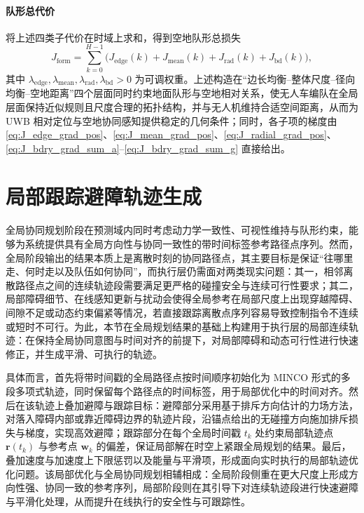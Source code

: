 \paragraph{队形总代价}
将上述四类子代价在时域上求和，得到空地队形总损失
\begin{equation}
\label{eq:J_form_total}
J_{\mathrm{form}}
=\sum_{k=0}^{H-1}\Big(
J_{\mathrm{edge}}(k)
+J_{\mathrm{mean}}(k)
+J_{\mathrm{rad}}(k)
+J_{\mathrm{bd}}(k)
\Big),
\end{equation}
其中 \(\lambda_{\mathrm{edge}},\lambda_{\mathrm{mean}},\lambda_{\mathrm{rad}},\lambda_{\mathrm{bd}}>0\) 为可调权重。上述构造在“边长均衡--整体尺度--径向均衡--空地距离”四个层面同时约束地面队形与空地相对关系，使无人车编队在全局层面保持近似规则且尺度合理的拓扑结构，并与无人机维持合适空间距离，从而为 UWB 相对定位与空地协同感知提供稳定的几何条件；同时，各子项的梯度由\eqref{eq:J_edge_grad_pos}、\eqref{eq:J_mean_grad_pos}、\eqref{eq:J_radial_grad_pos}、\eqref{eq:J_bdry_grad_sum_a}--\eqref{eq:J_bdry_grad_sum_g} 直接给出。

\section{局部跟踪避障轨迹生成} \label{sec:local-tracking}

全局协同规划阶段在预测域内同时考虑动力学一致性、可视性维持与队形约束，能够为系统提供具有全局方向性与协同一致性的带时间标签参考路径点序列。然而，全局阶段输出的结果本质上是离散时刻的协同路径点，其主要目标是保证“往哪里走、何时走以及队伍如何协同”，而执行层仍需面对两类现实问题：其一，相邻离散路径点之间的连续轨迹段需要满足更严格的碰撞安全与连续可行性要求；其二，局部障碍细节、在线感知更新与扰动会使得全局参考在局部尺度上出现穿越障碍、间隙不足或动态约束偏紧等情况，若直接跟踪离散点序列容易导致控制指令不连续或短时不可行。为此，本节在全局规划结果的基础上构建用于执行层的局部连续轨迹：在保持全局协同意图与时间对齐的前提下，对局部障碍和动态可行性进行快速修正，并生成平滑、可执行的轨迹。

具体而言，首先将带时间戳的全局路径点按时间顺序初始化为 MINCO 形式的多段多项式轨迹\cite{wang2022geometrically}，同时保留每个路径点的时间标签，用于局部优化中的时间对齐。然后在该轨迹上叠加避障与跟踪目标：避障部分采用基于排斥方向估计的力场方法\cite{zhou2021egoplanner}，对落入障碍内部或靠近障碍边界的轨迹片段，沿锚点给出的无碰撞方向施加排斥损失与梯度，实现高效避障；跟踪部分在每个全局时间戳 \(t_k\) 处约束局部轨迹点 \(\mathbf{r}(t_k)\) 与参考点 \(\mathbf{w}_k\) 的偏差，保证局部解在时空上紧跟全局规划的结果。最后，叠加速度与加速度上下限惩罚以及能量与平滑项，形成面向实时执行的局部轨迹优化问题。该局部优化与全局协同规划相辅相成：全局阶段侧重在更大尺度上形成方向性强、协同一致的参考序列，局部阶段则在其引导下对连续轨迹段进行快速避障与平滑化处理，从而提升在线执行的安全性与可跟踪性。

